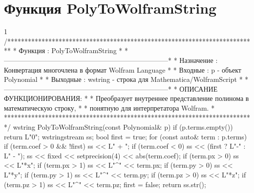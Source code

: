 \section{Функция PolyToWolframString}
\footnotesize
\begin{listing}{1}
/*************************************************************************
* Функция       : PolyToWolframString                                    *
*------------------------------------------------------------------------*
* Назначение    : Конвертация многочлена в формат Wolfram Language      *
* Входные       : p - объект Polynomial                                  *
* Выходные      : wstring - строка для Mathematica/WolframScript         *
*------------------------------------------------------------------------*
* ОПИСАНИЕ ФУНКЦИОНИРОВАНИЯ:                                             *
* Преобразует внутреннее представление полинома в математическую строку, *
* понятную для интерпретатора Wolfram.                                   *
*************************************************************************/
wstring PolyToWolframString(const Polynomial& p) {
    if (p.terms.empty()) return L"0"; wstringstream ss; bool first = true;
    for (const auto& term : p.terms) { if (term.coef > 0 && !first) ss << L" + ";
        if (term.coef < 0) ss << (first ? L"-" : L" - ");
        ss << fixed << setprecision(4) << abs(term.coef);
        if (term.px > 0) { 
            ss << L"*x"; if (term.px > 1) ss << L"^" << term.px;}
        if (term.py > 0) { 
            ss << L"*y"; if (term.py > 1) ss << L"^" << term.py;}
        if (term.pz > 0) { 
            ss << L"*z"; if (term.pz > 1) ss << L"^" << term.pz; 
        }
        first = false;
    }
    return ss.str();
}
\end{listing}
\normalsize

\pagebreak

